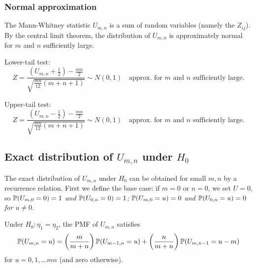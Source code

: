 \subsubsection{Normal approximation}

The Mann-Whitney statistic $U_{m,n}$ is a sum of random variables (namely the $Z_{ij}$). By the central limit theorem, the distribution of $U_{m,n}$ is approximately normal for $m$ and $n$ sufficiently large. 

\bigskip
Lower-tail test:
\[
Z = \frac{(U_{m,n}+\frac{1}{2}) - \frac{mn}{2}}{\sqrt{\frac{mn}{12}(m+n+1)}} \sim  N(0,1)\quad\text{approx. for $m$ and $n$ sufficiently large.}
\]

Upper-tail test:
\[
Z = \frac{(U_{m,n}-\frac{1}{2}) - \frac{mn}{2}}{\sqrt{\frac{mn}{12}(m+n+1)}} \sim  N(0,1)\quad\text{approx. for $m$ and $n$ sufficiently large.}
\]


\subsection{Exact distribution of $U_{m,n}$ under $H_0$}
The exact distribution of $U_{m,n}$ under $H_0$ can be obtained for small $m,n$ by a recurrence relation. First we define the base case: if $m = 0$ or $n = 0$, we set $U=0$, so
\bit
\it $\mathbb{P}(U_{m,0}=0) = 1$ and $\mathbb{P}(U_{0,n}=0) = 1$; 
\it $\mathbb{P}(U_{m,0}=u) = 0$ and $\mathbb{P}(U_{0,n}=u) = 0$ for $u\neq 0$.
\eit

%
%

\begin{theorem}
Under $H_0:\eta_1=\eta_2$, the PMF of $U_{m,n}$ satisfies
\[
\mathbb{P}(U_{m,n}=u) = \left(\frac{m}{m+n}\right)\mathbb{P}(U_{m-1,n}=u) + \left(\frac{n}{m+n}\right)\mathbb{P}(U_{m,n-1}=u-m)
\]
for $u=0,1,\ldots mn$ (and zero otherwise).
\end{theorem}

